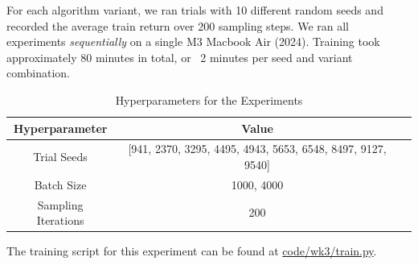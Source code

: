 \documentclass{article} %
\begin{document}
For each algorithm variant, we ran trials with 10 different random seeds
and recorded the average train return over 200 sampling steps.
{
\color{red}
We ran all experiments \textit{sequentially} on a single M3 Macbook Air (2024).
Training took approximately 80 minutes in total, or ~2 minutes per seed and variant combination.
}
\begin{table}[h] \label{tab:hyperparameters}
    \centering
    \begin{tabular}{ccc}
        \toprule
        Hyperparameter & Value \\
        \midrule
        Trial Seeds & [941, 2370, 3295, 4495, 4943, 5653, 6548, 8497, 9127, 9540] \\
        Batch Size & {1000, 4000} \\
        Sampling Iterations & 200 \\
        \bottomrule
    \end{tabular}
    \caption{Hyperparameters for the Experiments}
    \label{tab:hyperparameters}
\end{table}

The training script for this experiment can be found at \href{code/wk3/train.py}{code/wk3/train.py}.
\end{document}
